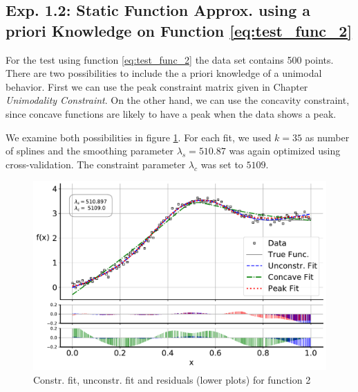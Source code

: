 \documentclass[10pt,a4paper]{article}
\begin{document}




\subsection{Exp. 1.2: Static Function Approx. using a priori Knowledge on Function \ref{eq:test_func_2}} \label{subsec:exp12}

For the test using function \ref{eq:test_func_2} the data set contains 500 points. There are two possibilities to include the a priori knowledge of a unimodal behavior. First we can use the peak constraint matrix given in Chapter \emph{Unimodality Constraint}. On the other hand, we can use the concavity constraint, since concave functions are likely to have a peak when the data shows a peak. 

We examine both possibilities in figure \ref{fig:test_func_2_fit}. For each fit, we used $k=35$ as number of splines and the smoothing parameter $\lambda_s=510.87$ was again optimized using cross-validation. The constraint parameter $\lambda_c$ was set to $5109$.

\begin{figure}[H]
	\centering
	\includegraphics[width=\columnwidth]{../thesisplots/exp_peak_fit.pdf}
	\caption{Constr. fit, unconstr. fit and residuals (lower plots) for function 2}
	\label{fig:test_func_2_fit}
\end{figure}
 
\end{document}
